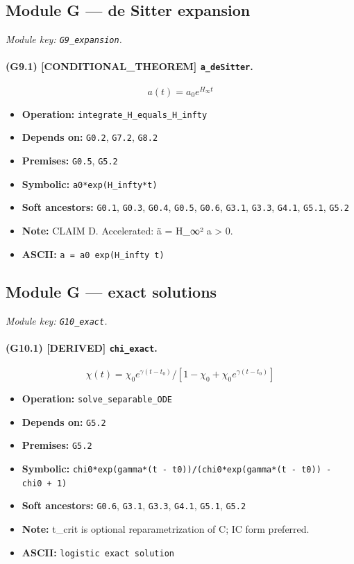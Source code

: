 \documentclass[11pt,a4paper]{article}
\theoremstyle{remark}\newtheorem*{caution}{Caution}
\newcommand{\tagbox}[1]{\textsc{[#1]}}
\begin{document}
\subsection{Module G --- de Sitter expansion}
\textit{Module key: \texttt{G9\_expansion}.}
\paragraph{(G9.1) \tagbox{CONDITIONAL\_THEOREM} \texttt{a\_deSitter}.}
\begin{equation}
a(t)=a_0 e^{H_\infty t}
\tag{G9.1}
\end{equation}
\begin{itemize}\setlength{\itemsep}{0.12em}
\item \textbf{Operation:} \texttt{integrate\_H\_equals\_H\_infty}
\item \textbf{Depends on:} \texttt{G0.2}, \texttt{G7.2}, \texttt{G8.2}
\item \textbf{Premises:} \texttt{G0.5}, \texttt{G5.2}
\item \textbf{Symbolic:} \texttt{a0*exp(H\_infty*t)}
\item \textbf{Soft ancestors:} \texttt{G0.1}, \texttt{G0.3}, \texttt{G0.4}, \texttt{G0.5}, \texttt{G0.6}, \texttt{G3.1}, \texttt{G3.3}, \texttt{G4.1}, \texttt{G5.1}, \texttt{G5.2}
\item \textbf{Note:} CLAIM D. Accelerated: ä = H\_∞² a > 0.
\item \textbf{ASCII:} \texttt{a = a0 exp(H\_infty t)}
\end{itemize}
\subsection{Module G --- exact solutions}
\textit{Module key: \texttt{G10\_exact}.}
\paragraph{(G10.1) \tagbox{DERIVED} \texttt{chi\_exact}.}
\begin{equation}
\chi(t)=\chi_0 e^{\gamma(t-t_0)}/[1-\chi_0+\chi_0 e^{\gamma(t-t_0)}]
\tag{G10.1}
\end{equation}
\begin{itemize}\setlength{\itemsep}{0.12em}
\item \textbf{Operation:} \texttt{solve\_separable\_ODE}
\item \textbf{Depends on:} \texttt{G5.2}
\item \textbf{Premises:} \texttt{G5.2}
\item \textbf{Symbolic:} \texttt{chi0*exp(gamma*(t - t0))/(chi0*exp(gamma*(t - t0)) - chi0 + 1)}
\item \textbf{Soft ancestors:} \texttt{G0.6}, \texttt{G3.1}, \texttt{G3.3}, \texttt{G4.1}, \texttt{G5.1}, \texttt{G5.2}
\item \textbf{Note:} t\_crit is optional reparametrization of C; IC form preferred.
\item \textbf{ASCII:} \texttt{logistic exact solution}
\end{itemize}
\end{document}

